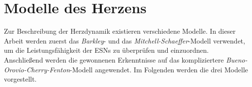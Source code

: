 \section{Modelle des Herzens}
Zur Beschreibung der Herzdynamik existieren verschiedene Modelle. In dieser Arbeit werden zuerst das \textit{Barkley}- und das \textit{Mitchell-Schaeffer}-Modell verwendet, um die Leistungsfähigkeit der \textsc{ESN}s zu überprüfen und einzuordnen. Anschließend werden die gewonnenen Erkenntnisse auf das kompliziertere \textit{Bueno-Orovio-Cherry-Fenton}-Modell angewendet. Im Folgenden werden die drei Modelle vorgestellt.





\clearpage